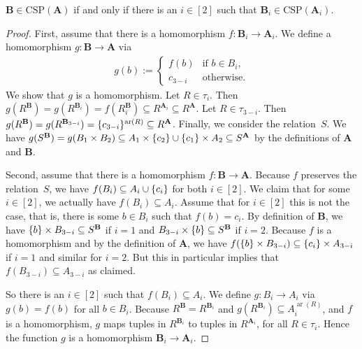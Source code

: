 \documentclass[a4paper,english, thm-restate]{lipics-v2021}
\DeclarePairedDelimiter\set{\lbrace}{\rbrace}
\newcommand{\sig}{\tau}
\newcommand{\arity}[1]{\operatorname*{ar}(#1)}
\newcommand{\StructA}{\mathbf{A}}
\newcommand{\StructB}{\mathbf{B}}
\newcommand{\CSP}[1]{\mathrm{CSP}(#1)}
\begin{document}
	\begin{lemma}
		\label{lem:hom-or-construction-correct}
		$\StructB \in \CSP{\StructA}$ if and only if there is an $i \in [2]$
		such that $\StructB_i \in \CSP{\StructA_i}$.
	\end{lemma}
	\begin{proof}
		First, assume that there is a homomorphism $f \colon \StructB_i \to \StructA_i$.
		We define a homomorphism $g \colon \StructB \to \StructA$ via
		\begin{align*}
			g(b) := \begin{cases}
				f(b) & \text{if } b \in B_i, \\
				c_{3-i} & \text{otherwise.}
			\end{cases}
		\end{align*}
		We show that $g$ is a homomorphism.
		Let $R \in \sig_i$.
		Then $g(R^\StructB) = g(R^{\StructB_i}) = 
		f(R^\StructB_i) \subseteq R^{\StructA_i} \subseteq R^\StructA$.
		Let $R \in \sig_{3-i}$. Then $g(R^\StructB) = g(R^{\StructB_{3-i}}) =  \set{c_{3-i}}^{\arity{R}} \subseteq R^\StructA$.
		Finally, we consider the relation~$S$.
		We have $g(S^\StructB)  = g(B_1 \times B_2)\subseteq A_1 \times \set{c_2} \cup \set{c_1} \times A_2   \subseteq S^\StructA$
		by the definitions of $\StructA$ and $\StructB$.
		
		Second, assume that there is a homomorphism $f \colon \StructB \to \StructA$.
		Because $f$ preserves the relation~$S$,
		we have $f(B_{i}) \subseteq A_i \cup \set{c_i}$ for both $i \in [2]$.
		We  claim that for some $i \in [2]$, we actually have $f(B_{i}) \subseteq A_i$.
		Assume that for $i \in [2]$ this is not the case, that is,
		there is some $b \in B_i$ such that $f(b) = c_{i}$.
		By definition of $\StructB$, we have $\set{b} \times B_{3-i} \subseteq S^\StructB$ if $i=1$ and   $B_{3-i} \times \set{b} \subseteq S^\StructB$ if $i=2$.
		Because $f$ is a homomorphism and by the definition of $\StructA$,
		we have $f(\set{b} \times B_{3-i}) \subseteq \set{ c_{i}} \times A_{3-i}$
		if $i=1$ and similar for $i=2$.
		But this in particular implies that $f( B_{3-i}) \subseteq  A_{3-i}$ as claimed.
		
		So there is an $i \in [2]$ such that $f(B_{i}) \subseteq A_i$.
		We define $g \colon B_i \to A_i$ via $g(b) = f(b)$ for all $b \in B_i$.
		Because $R^\StructB = R^{\StructB_i}$ and $g(R^{\StructB_i}) \subseteq A_i^{\arity{R}}$, and $f$ is a homomorphism, $g$ maps tuples in $R^{\StructB_i}$ to tuples in $R^{\StructA_i}$, for all $R \in \sig_i$. 
		Hence the function $g$ is a homomorphism $\StructB_i \to \StructA_i$.
	\end{proof}
	
\end{document}
